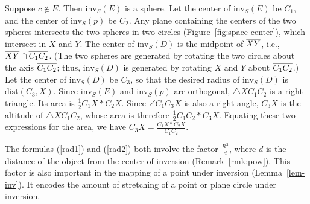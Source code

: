 \begin{enumerate}
Suppose $c \not \in E$.
Then $\mbox{inv}_{S}(E)$ is a sphere.
Let the center of $\mbox{inv}_{S}(E)$ be $C_{1}$, and
the center of $\mbox{inv}_{S}(p)$ be $C_{2}$.
Any plane containing the centers of the two spheres 
intersects the two spheres in two circles (Figure~\ref{fig:space-center}),
which intersect in $X$ and $Y$.
The center of $\mbox{inv}_{S}(D)$ is the midpoint of $\mbox{$\overline{XY}$}$,
i.e., $\mbox{$\overline{XY}$} \cap \mbox{$\overline{C_{1}C_{2}}$}$.
(The two spheres are generated by rotating the two circles about 
the axis $\mbox{$\overline{C_{1}C_{2}}$}$; 
thus, $\mbox{inv}_{S}(D)$ is generated by rotating $X$ and $Y$ about
$\mbox{$\overline{C_{1}C_{2}}$}$.)
Let the center of $\mbox{inv}_{S}(D)$ be $C_{3}$,
so that
the desired radius of $\mbox{inv}_{S}(D)$ is $\mbox{dist}(C_{3},X)$.
Since $\mbox{inv}_{S}(E)$ and $\mbox{inv}_{S}(p)$ are orthogonal,
$\triangle X C_1 C_2$ is a right triangle.
Its area is $\frac{1}{2} C_1 X * C_2 X$.
Since $\angle C_1 C_3 X$ is also a right angle, $C_3 X$ is the altitude
of $\triangle X C_1 C_2$, whose area is therefore $\frac{1}{2} C_1 C_2 *C_3 X$.
Equating these two expressions for the area, we have
$C_3 X = \frac{C_1 X * C_2 X}{C_1 C_2}$.
%
%
\end{enumerate}
\QED



\begin{rmk}
The formulas (\ref{rad1}) and (\ref{rad2}) both 
involve the factor $\frac{R^2}{d}$, 
where $d$ is the
distance of the object from the center of inversion (Remark~\ref{rmk:pow}).
This factor is also important in the mapping of a point under inversion
(Lemma~\ref{lem-inv}).
It encodes the amount of stretching of a point or plane circle 
under inversion.
%
\end{rmk}

